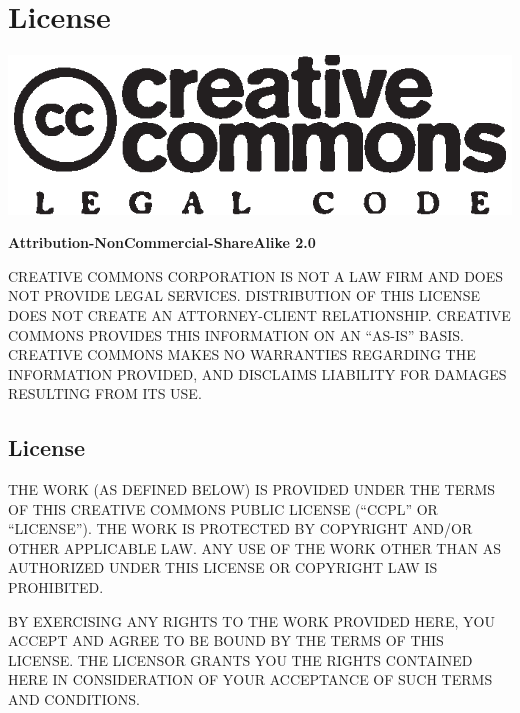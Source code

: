 \chapter*{License}%
%

\begin{center}
\includegraphics{logo_code}

\bigskip

\textbf{Attribution-NonCommercial-ShareAlike 2.0}
\end{center}

\begin{framed}
CREATIVE COMMONS CORPORATION IS NOT A LAW FIRM AND DOES NOT PROVIDE
LEGAL SERVICES. DISTRIBUTION OF THIS LICENSE DOES NOT CREATE AN
ATTORNEY-CLIENT RELATIONSHIP. CREATIVE COMMONS PROVIDES THIS
INFORMATION ON AN ``AS-IS'' BASIS. CREATIVE COMMONS MAKES NO
WARRANTIES REGARDING THE INFORMATION PROVIDED, AND DISCLAIMS LIABILITY
FOR DAMAGES RESULTING FROM ITS USE.
\end{framed}

\section{License}

{\sloppy
THE WORK (AS DEFINED BELOW) IS PROVIDED UNDER THE TERMS OF THIS
CREATIVE COMMONS PUBLIC LICENSE (``CCPL'' OR ``LICENSE''). THE WORK IS
PROTECTED BY COPYRIGHT AND/OR OTHER APPLICABLE LAW. ANY USE OF THE
WORK OTHER THAN AS AUTHORIZED UNDER THIS LICENSE OR COPYRIGHT LAW IS
PROHIBITED.

BY EXERCISING ANY RIGHTS TO THE WORK PROVIDED HERE, YOU ACCEPT AND
AGREE TO BE BOUND BY THE TERMS OF THIS LICENSE. THE LICENSOR GRANTS
YOU THE RIGHTS CONTAINED HERE IN CONSIDERATION OF YOUR ACCEPTANCE OF
SUCH TERMS AND CONDITIONS.}

